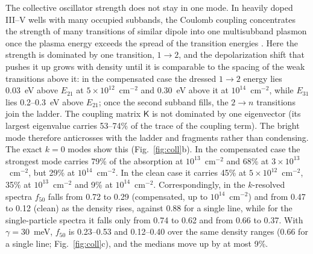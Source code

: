 \documentclass[11pt]{article}
\begin{document}
The collective oscillator strength does not stay in one mode. In heavily doped III--V wells with many occupied subbands, the Coulomb coupling concentrates the strength of many transitions of similar dipole into one multisubband plasmon once the plasma energy exceeds the spread of the transition energies \cite{Delteil2012,Vasanelli2020}. Here the strength is dominated by one transition, $1\to2$, and the depolarization shift that pushes it up grows with density until it is comparable to the spacing of the weak transitions above it: in the compensated case the dressed $1\to2$ energy lies 0.03~eV above $E_{21}$ at $5\times10^{12}$~cm$^{-2}$ and 0.30~eV above it at $10^{14}$~cm$^{-2}$, while $E_{31}$ lies 0.2--0.3~eV above $E_{21}$; once the second subband fills, the $2\to n$ transitions join the ladder. The coupling matrix $\mathsf K$ is not dominated by one eigenvector (its largest eigenvalue carries 53--74\% of the trace of the coupling term). The bright mode therefore anticrosses with the ladder and fragments rather than condensing. The exact $k=0$ modes show this (Fig.~\ref{fig:coll}b). In the compensated case the strongest mode carries 79\% of the absorption at $10^{13}$~cm$^{-2}$ and 68\% at $3\times10^{13}$~cm$^{-2}$, but 29\% at $10^{14}$~cm$^{-2}$. In the clean case it carries 45\% at $5\times10^{12}$~cm$^{-2}$, 35\% at $10^{13}$~cm$^{-2}$ and 9\% at $10^{14}$~cm$^{-2}$. Correspondingly, in the $k$-resolved spectra $f_{50}$ falls from 0.72 to 0.29 (compensated, up to $10^{14}$~cm$^{-2}$) and from 0.47 to 0.12 (clean) as the density rises, against 0.88 for a single line, while for the single-particle spectra it falls only from 0.74 to 0.62 and from 0.66 to 0.37. With $\gamma=30$~meV, $f_{50}$ is 0.23--0.53 and 0.12--0.40 over the same density ranges (0.66 for a single line; Fig.~\ref{fig:coll}c), and the medians move up by at most 9\%.
\end{document}
